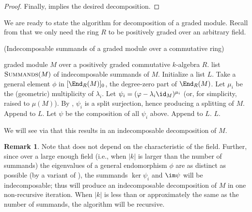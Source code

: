 \documentclass[12pt]{article}
\theoremstyle{theorem}
\numberwithin{thm}{section}
\theoremstyle{definition}
\newtheorem{rem}[thm]{Remark}
\begin{document}
\begin{proof}
  Finally,  implies the desired decomposition.
\end{proof}

We are ready to state the algorithm for decomposition of a graded module. Recall from  that we only need the ring $R$ to be positively graded over an arbitrary field.

\begin{algorithm}[H]
  \caption{(Indecomposable summands of a graded module over a commutative ring)}\label{alg:graded}
  \begin{algorithmic}[1]
    \smallskip
    \Require graded module $M$ over a positively graded commutative $k$-algebra $R$.
    \Ensure  list $\textproc{Summands}(M)$ of indecomposable summands of $M$.
    \State Initialize a list $L$.
    \State Take a general element $\phi$ in $[\End_R(M)]_0$,
           the degree-zero part of $\End_R(M)$. \label{item:End0}
      \State Let $\mu_i$ be the (geometric) multiplicity of $\lambda_i$.
      \State Let $\psi_i = (\phi - \lambda_i \id_M)^{\mu_i}$ (or, for simplicity, raised to $\mu(M)$).
      \State By , $\psi_i$ is a split surjection, hence producing a splitting of $M$.
      \State Append  to $L$.
    \EndFor
    \State Let $\psi$ be the composition of all $\psi_i$ above.
      \State Append  to $L$.
    \EndIf
    \State \Return $L$.
  \end{algorithmic}
\end{algorithm}

We will see via  that this results in an indecomposable decomposition of $M$.

\begin{rem}\label{rem:graded}
  Note that  does not depend on the characteristic of the field. Further, since over a large enough field (i.e., when $|k|$ is larger than the number of summands) the eigenvalues of a general endomorphism $\phi$ are as distinct as  possible (by a variant of ), the summands $\ker\psi_i$ and $\im\psi$ will be indecomposable; thus  will produce an indecomposable decomposition of $M$ in one non-recursive iteration. When $|k|$ is less than or approximately the same as the number of summands, the algorithm will be recursive.
\end{rem}

\end{document}
